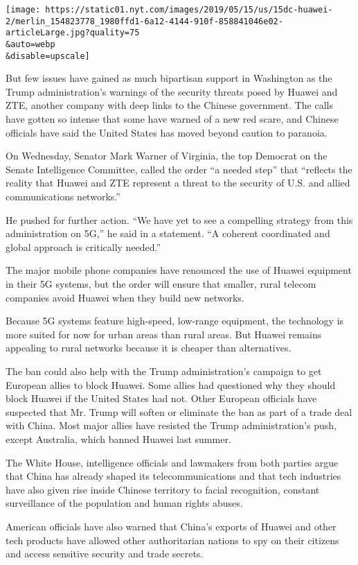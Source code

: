 \texttt{[image: https://static01.nyt.com/images/2019/05/15/us/15dc-huawei-2/merlin\_154823778\_1980ffd1-6a12-4144-910f-858841046e02-articleLarge.jpg?quality=75\\\&auto=webp\\\&disable=upscale]}

But few issues have gained as much bipartisan support in Washington as
the Trump administration's warnings of the security threats posed by
Huawei and ZTE, another company with deep links to the Chinese
government. The calls have gotten so intense that some have warned of a
new red scare, and Chinese officials have said the United States has
moved beyond caution to paranoia.

On Wednesday, Senator Mark Warner of Virginia, the top Democrat on the
Senate Intelligence Committee, called the order ``a needed step'' that
``reflects the reality that Huawei and ZTE represent a threat to the
security of U.S. and allied communications networks.''

He pushed for further action. ``We have yet to see a compelling strategy
from this administration on 5G,'' he said in a statement. ``A coherent
coordinated and global approach is critically needed.''

The major mobile phone companies have renounced the use of Huawei
equipment in their 5G systems, but the order will ensure that smaller,
rural telecom companies avoid Huawei when they build new networks.

Because 5G systems feature high-speed, low-range equipment, the
technology is more suited for now for urban areas than rural areas. But
Huawei remains appealing to rural networks because it is cheaper than
alternatives.

The ban could also help with the Trump administration's campaign to get
European allies to block Huawei. Some allies had questioned why they
should block Huawei if the United States had not. Other European
officials have suspected that Mr. Trump will soften or eliminate the ban
as part of a trade deal with China. Most major allies have resisted the
Trump administration's push, except Australia, which banned Huawei last
summer.

The White House, intelligence officials and lawmakers from both parties
argue that China has already shaped its telecommunications and that tech
industries have also given rise inside Chinese territory to facial
recognition, constant surveillance of the population and human rights
abuses.

American officials have also warned that China's exports of Huawei and
other tech products have allowed other authoritarian nations to spy on
their citizens and access sensitive security and trade secrets.

